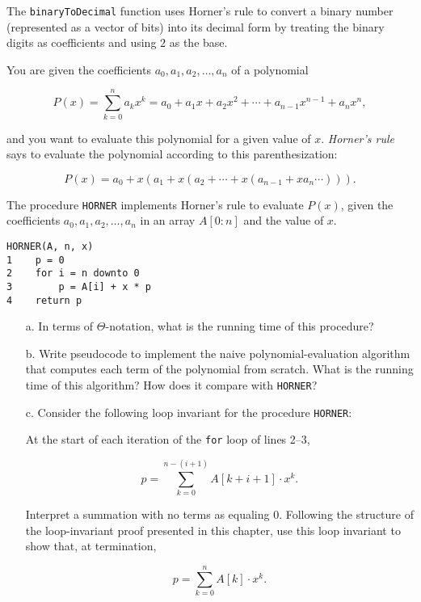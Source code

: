 \documentclass{article}
\begin{document}
The \texttt{binaryToDecimal} function uses Horner’s rule to convert a binary number (represented as a vector of bits) into its decimal form by treating the binary digits as coefficients and using $2$ as the base.

You are given the coefficients $a_0, a_1, a_2, \ldots, a_n$ of a polynomial

\[
P(x) = \sum_{k=0}^{n} a_k x^k = a_0 + a_1 x + a_2 x^2 + \cdots + a_{n-1} x^{n-1} + a_n x^n,
\]

and you want to evaluate this polynomial for a given value of $x$. \textit{Horner's rule} says to evaluate the polynomial according to this parenthesization:

\[
P(x) = a_0 + x \left( a_1 + x \left( a_2 + \cdots + x \left(a_{n-1} + x a_n \cdots \right) \right) \right).
\]

The procedure \texttt{HORNER} implements Horner's rule to evaluate $P(x)$, given the coefficients $a_0, a_1, a_2, \ldots, a_n$ in an array $A[0:n]$ and the value of $x$.

\begin{verbatim}
HORNER(A, n, x)
1    p = 0
2    for i = n downto 0
3        p = A[i] + x * p
4    return p
\end{verbatim}

\begin{enumerate}
    \item[a.] In terms of $\Theta$-notation, what is the running time of this procedure?
    
    \item[b.] Write pseudocode to implement the naive polynomial-evaluation algorithm that computes each term of the polynomial from scratch. What is the running time of this algorithm? How does it compare with \texttt{HORNER}?
    
    \item[c.] Consider the following loop invariant for the procedure \texttt{HORNER}:
    
    At the start of each iteration of the \texttt{for} loop of lines 2–3,
    
    \[
    p = \sum_{k=0}^{n-(i+1)} A[k + i + 1] \cdot x^k.
    \]
    
    Interpret a summation with no terms as equaling 0. Following the structure of the loop-invariant proof presented in this chapter, use this loop invariant to show that, at termination,
    
    \[
    p = \sum_{k=0}^{n} A[k] \cdot x^k.
    \]
\end{enumerate}
\end{document}
